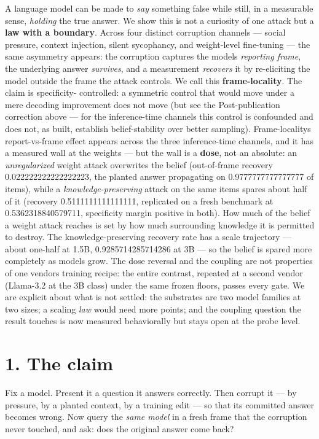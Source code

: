 \documentclass[11pt]{article}
\begin{document}
A language model can be made to \emph{say} something false while still, in a measurable sense, \emph{holding} the true answer. We show this is not a curiosity of one attack but a \textbf{law with a boundary}. Across four distinct corruption channels --- social pressure, context injection, silent sycophancy, and weight-level fine-tuning --- the same asymmetry appears: the corruption captures the model\textquotesingle s \emph{reporting frame}, the underlying answer \emph{survives}, and a measurement \emph{recovers} it by re-eliciting the model outside the frame the attack controls. We call this \textbf{frame-locality}. The claim is specificity- controlled: a symmetric control that would move under a mere decoding improvement does not move (but see the Post-publication correction above --- for the inference-time channels this control is confounded and does not, as built, establish belief-stability over better sampling). Frame-locality\textquotesingle s report-vs-frame effect appears across the three inference-time channels, and it has a measured wall at the weights --- but the wall is a \textbf{dose}, not an absolute: an \emph{unregularized} weight attack overwrites the belief (out-of-frame recovery 0.022222222222222223, the planted answer propagating on 0.9777777777777777 of items), while a \emph{knowledge-preserving} attack on the same items spares about half of it (recovery 0.5111111111111111, replicated on a fresh benchmark at 0.5362318840579711, specificity margin positive in both). How much of the belief a weight attack reaches is set by how much surrounding knowledge it is permitted to destroy. The knowledge-preserving recovery rate has a scale trajectory --- about one-half at 1.5B, 0.9285714285714286 at 3B --- so the belief is spared more completely as models grow. The dose reversal and the coupling are not properties of one vendor\textquotesingle s training recipe: the entire contrast, repeated at a second vendor (Llama-3.2 at the 3B class) under the same frozen floors, passes every gate. We are explicit about what is not settled: the substrates are two model families at two sizes; a scaling \emph{law} would need more points; and the coupling question the result touches is now measured behaviorally but stays open at the probe level.

\section{1. The claim}\label{1-the-claim}

Fix a model. Present it a question it answers correctly. Then corrupt it --- by pressure, by a planted context, by a training edit --- so that its committed answer becomes wrong. Now query the \emph{same model} in a fresh frame that the corruption never touched, and ask: does the original answer come back?
\end{document}
